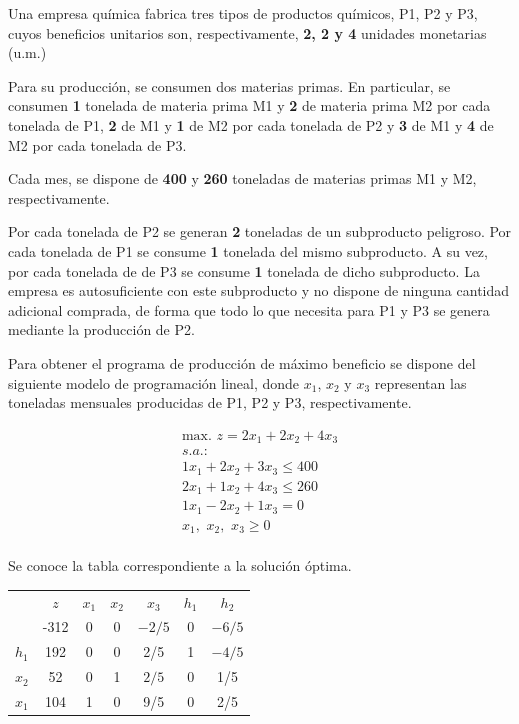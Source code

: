 Una empresa química fabrica tres tipos de productos químicos, P1, P2 y P3, cuyos beneficios unitarios son, respectivamente, \textbf{2, 2 y 4} unidades monetarias (u.m.) 

Para su producción, se consumen dos materias primas. En particular, se consumen \textbf{1} tonelada de materia prima M1 y \textbf{2} de materia prima M2 por cada tonelada de P1, \textbf{2} de M1 y \textbf{1} de M2 por cada tonelada de P2 y \textbf{3} de M1 y \textbf{4} de M2 por cada tonelada de P3.

Cada mes, se dispone de \textbf{400} y \textbf{260} toneladas de materias primas M1 y M2, respectivamente. 

Por cada tonelada de P2 se generan \textbf{2} toneladas de un subproducto peligroso. Por cada tonelada de P1 se consume \textbf{1} tonelada del mismo subproducto. A su vez, por cada tonelada de de P3 se consume \textbf{1} tonelada de dicho subproducto. La empresa es autosuficiente con este subproducto y no dispone de ninguna cantidad adicional comprada, de forma que todo lo que necesita para P1 y P3 se genera mediante la producción de P2.


Para obtener el programa de producción de máximo beneficio se dispone del siguiente modelo de programación lineal, donde $x_1$, $x_2$ y $x_3$ representan las toneladas mensuales producidas de P1, P2 y P3, respectivamente.
 
\begin{equation}
\begin{split}
\mbox{max. } z = 2x_1 + 2x_2 + 4x_3\\
s.a.:\\
1x_1 + 2x_2 + 3x_3 \leq 400\\
2x_1 + 1x_2 + 4x_3 \leq 260\\
1x_1 - 2x_2 + 1x_3 = 0\\
x_1,\,\,x_2,\,\,x_3\geq 0\\
\end{split}
\end{equation}

Se conoce la tabla correspondiente a la solución óptima.

\begin{center}
\begin{tabular}{c|c|ccccc|}
 & $z$ & $x_1$ & $x_2$ & $x_3$ & $h_1$ & $h_2$\\ 
      & -312 & 0 & 0 & $-2/5$ & 0 & $-6/5$ \\ 
\hline
$h_1$ & 192  & 0 & 0 & 2/5 & 1 & $-4/5$\\ 
$x_2$ & 52  & 0 & 1 & $2/5$ & 0 & 1/5\\ 
$x_1$ & 104  & 1 & 0 & 9/5 & 0 & 2/5\\ 
\hline
\end{tabular}
\end{center}

